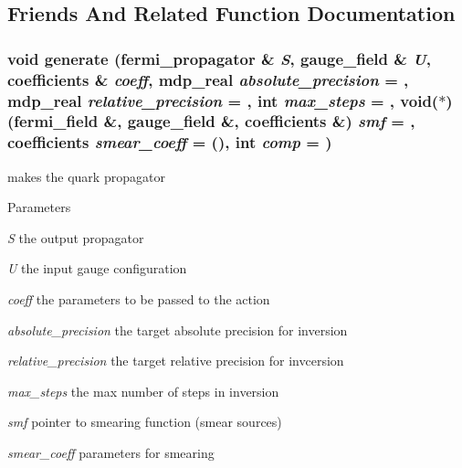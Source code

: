 \subsection{Friends And Related Function Documentation}
\hypertarget{classfermi__propagator_a0b3730ff1e1058f1e13b537d429c7333}{
\subsubsection[{generate}]{\setlength{\rightskip}{0pt plus 5cm}void generate ({\bf fermi\_\-propagator} \& {\em S}, \/  {\bf gauge\_\-field} \& {\em U}, \/  {\bf coefficients} \& {\em coeff}, \/  {\bf mdp\_\-real} {\em absolute\_\-precision} = {}, \/  {\bf mdp\_\-real} {\em relative\_\-precision} = {}, \/  int {\em max\_\-steps} = {}, \/  void($\ast$)({\bf fermi\_\-field} \&, {\bf gauge\_\-field} \&, {\bf coefficients} \&) {\em smf} = {}, \/  {\bf coefficients} {\em smear\_\-coeff} = {()}, \/  int {\em comp} = {})}}
\label{classfermi__propagator_a0b3730ff1e1058f1e13b537d429c7333}
makes the quark propagator


\begin{DoxyParams}{Parameters}
\item[{\em S}]the output propagator \item[{\em U}]the input gauge configuration \item[{\em coeff}]the parameters to be passed to the action \item[{\em absolute\_\-precision}]the target absolute precision for inversion \item[{\em relative\_\-precision}]the target relative precision for invcersion \item[{\em max\_\-steps}]the max number of steps in inversion \item[{\em smf}]pointer to smearing function (smear sources) \item[{\em smear\_\-coeff}]parameters for smearing \end{DoxyParams}


